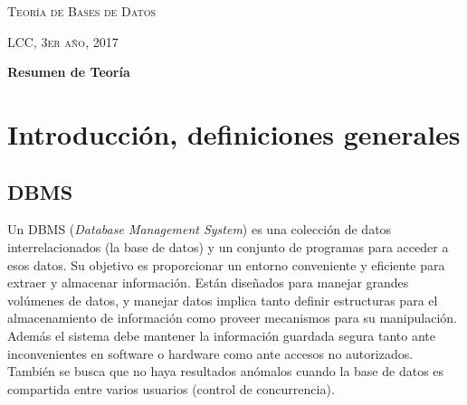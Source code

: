 \documentclass[a4paper]{article}
\begin{document}
\begin{centering}
{\scshape\huge Teor\'ia de Bases de Datos \par}
{\scshape\huge LCC, 3er año, 2017 \par}
{\huge\bfseries Resumen de Teor\'ia \par}
\end{centering}
\tableofcontents{}

\section{Introducción, definiciones generales}

\subsection{DBMS}
Un DBMS (\textit{Database Management System}) es una colecci\'on de datos interrelacionados
(la base de datos) y un conjunto de programas para acceder a esos datos. Su objetivo es proporcionar
un entorno conveniente y eficiente para extraer y almacenar informaci\'on. Est\'an diseñados para
manejar grandes volúmenes de datos, y manejar datos implica tanto definir estructuras para el
almacenamiento de información como proveer mecanismos para su manipulación. Además el sistema debe
mantener la información guardada segura tanto ante inconvenientes en software o hardware
como ante accesos no autorizados. También se busca que no haya resultados anómalos cuando la base
de datos es compartida entre varios usuarios (control de concurrencia).
\end{document}
